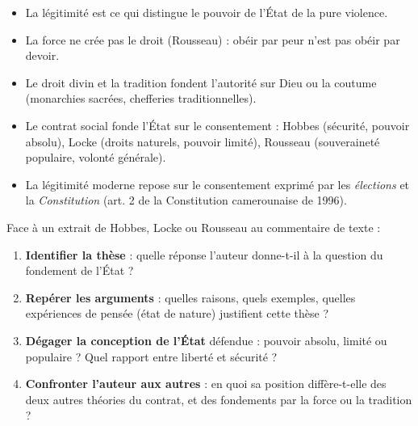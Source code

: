 \documentclass[11pt]{article}
\newcommand{\cle}[1]{{\popxbold\color{popdark}#1}}
\begin{document}
\begin{aretenir}[L'essentiel]
\begin{itemize}
\item La \cle{légitimité} est ce qui distingue le pouvoir de l'État de la pure violence.
\item La force ne crée pas le droit (Rousseau) : obéir par peur n'est pas obéir par devoir.
\item Le droit divin et la tradition fondent l'autorité sur Dieu ou la coutume (monarchies sacrées, chefferies traditionnelles).
\item Le \cle{contrat social} fonde l'État sur le consentement : Hobbes (sécurité, pouvoir absolu), Locke (droits naturels, pouvoir limité), Rousseau (souveraineté populaire, volonté générale).
\item La légitimité moderne repose sur le consentement exprimé par les \emph{élections} et la \emph{Constitution} (art. 2 de la Constitution camerounaise de 1996).
\end{itemize}
\end{aretenir}

\begin{methode}
Face à un extrait de Hobbes, Locke ou Rousseau au commentaire de texte :
\begin{enumerate}
\item \textbf{Identifier la thèse} : quelle réponse l'auteur donne-t-il à la question du fondement de l'État ?
\item \textbf{Repérer les arguments} : quelles raisons, quels exemples, quelles expériences de pensée (état de nature) justifient cette thèse ?
\item \textbf{Dégager la conception de l'État} défendue : pouvoir absolu, limité ou populaire ? Quel rapport entre liberté et sécurité ?
\item \textbf{Confronter l'auteur aux autres} : en quoi sa position diffère-t-elle des deux autres théories du contrat, et des fondements par la force ou la tradition ?
\end{enumerate}
\end{methode}
\end{document}
